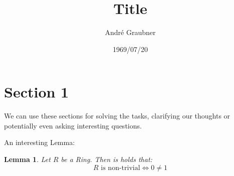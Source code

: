 \documentclass[a4paper]{article}
\title{Title}
\author{André Graubner}
\date{1969/07/20}
\newtheorem{lemma}{Lemma}
\begin{document}
 

\maketitle

\section{Section 1}

We can use these sections for solving the tasks, 
clarifying our thoughts or potentially even asking interesting
questions.

An interesting Lemma:

\begin{lemma}
Let $R$ be a Ring. Then is holds that:
	\[R \text{ is non-trivial} \iff 0 \neq 1\]
\end{lemma}
\end{document}
